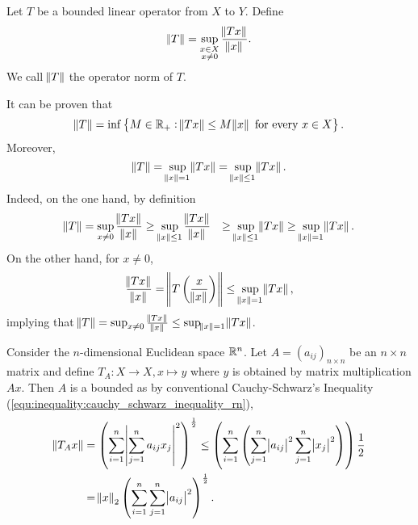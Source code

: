 \begin{defn}
Let $T$ be a bounded linear operator from $X$ to $Y$. 
Define 
\begin{equation*}
    \norm{T} = \sup_{\substack{x \in X \\ x \neq 0}} \frac{\norm{Tx}}{\norm{x}}.
\end{equation*}
We call $\norm{T}$ the operator norm of $T$.
\end{defn}
It can be proven that 
\begin{equation*}
    \norm{T} = \inf \left\{ M \in \mathbb{R}_{+}: \norm{Tx} \le M \norm{x} 
        \text{ for every } x \in X \right\}.
\end{equation*}
Moreover, 
\begin{equation*}
    \norm{T} = \sup_{\norm{x} = 1} \norm{Tx} 
    = \sup_{\norm{x} \le 1} \norm{Tx}. 
\end{equation*}
Indeed, on the one hand, by definition 
\begin{equation*}
    \begin{aligned}
        \norm{T} &= \sup_{x \neq 0} \frac{\norm{Tx}}{\norm{x}} 
        \ge \sup_{\norm{x} \le 1} \frac{\norm{Tx}}{\norm{x}} 
        &\ge \sup_{\norm{x} \le 1} \norm{Tx} 
        \ge \sup_{\norm{x} = 1} \norm{Tx}. 
    \end{aligned}
\end{equation*}
On the other hand, for $x \neq 0$, 
\begin{equation*}
    \frac{\norm{Tx}}{\norm{x}} = \norm{T\left( \frac{x}{\norm{x}} \right)} 
    \le \sup_{\norm{x} = 1} \norm{Tx}, 
\end{equation*}
implying that $\norm{T} = \sup_{x \neq 0} \frac{\norm{Tx}}{\norm{x}} 
\le \sup_{\norm{x} = 1} \norm{Tx}$. 

\begin{example}
Consider the $n$-dimensional Euclidean space $\mathbb{R}^n$. 
Let $A = (a_{ij})_{n \times n}$ be an $n \times n$ matrix and define $T_A: X 
\to X, x \mapsto y$ where $y$ is obtained by matrix multiplication $Ax$. 
Then $A$ is a bounded as by conventional Cauchy-Schwarz's Inequality 
(\ref{equ:inequality:cauchy_schwarz_inequality_rn}), 
\begin{equation*}
    \begin{aligned}
        \norm{T_A x} &= \left( \sum_{i=1}^{n} 
            \abs{\sum_{j=1}^{n} a_{ij}x_j}^2 \right)^\frac{1}{2} 
        \le \left( \sum_{i=1}^{n} 
                \left( \sum_{j=1}^{n} \abs{a_{ij}}^2 
                    \sum_{j=1}^{n} \abs{x_{j}}^2 \right) 
            \right) \frac{1}{2} \\
        &= \norm{x}_2 
            \left( \sum_{i=1}^{n} \sum_{j=1}^{n} 
            \abs{a_{ij}}^2 \right) ^\frac{1}{2}. 
    \end{aligned}
\end{equation*}
\end{example}

